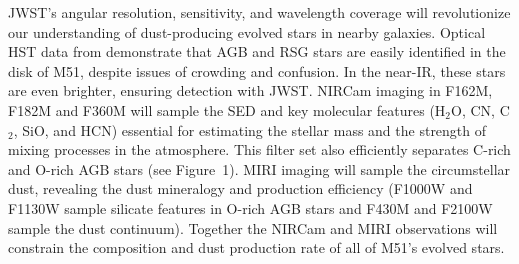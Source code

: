 \documentclass[12pt]{article}
\begin{document}

JWST's angular resolution, sensitivity, and wavelength coverage will revolutionize our understanding of dust-producing evolved stars in nearby galaxies. Optical HST data from \citet{mcquinn2016} demonstrate that AGB and RSG stars are easily identified in the disk of M51, despite issues of crowding and confusion. In the near-IR, these stars are even brighter, ensuring detection with JWST. NIRCam imaging in F162M, F182M and F360M will sample the SED and key molecular features  (H$_2$O, CN, C$_2$, SiO, and HCN) essential for estimating the stellar mass and the strength of mixing processes in the atmosphere. This filter set also efficiently separates C-rich and O-rich AGB stars (see Figure~1). MIRI imaging will sample the circumstellar dust, revealing the dust mineralogy and production efficiency (F1000W and F1130W sample silicate features in O-rich AGB stars and F430M and F2100W sample the dust continuum). Together the NIRCam and MIRI observations will constrain the composition and dust production rate of all of M51's evolved stars.
\end{document}
